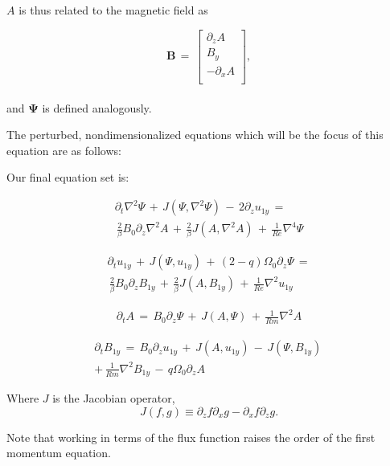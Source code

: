 \documentclass{emulateapj}
\newcommand{\beq}{\begin{equation}}
\newcommand{\eeq}{\end{equation}}
\newcommand\reye{\mathrel{Re}}
\newcommand\reym{\mathrel{Rm}}
\begin{document}
$A$ is thus related to the magnetic field as

\beq
\mathbf{B} \, = \, \left[\begin{matrix}
\partial_zA \\
B_{y} \\
-\partial_xA \\
\end{matrix}\right],\eeq \\

and $\mathbf{\Psi}$ is defined analogously.

The perturbed, nondimensionalized equations which will be the focus of this equation are as follows:

Our final equation set is: 

\begin{multline}
\label{eqset1}
\partial_t \nabla^2 \Psi \, + \, J\left(\Psi, \nabla^2 \Psi\right) \, - \, 2 \partial_z u_{1y} \, = \\
\, \frac{2}{\beta} B_0 \partial_z \nabla^2 A \, + \, \frac{2}{\beta}J\left(A, \nabla^2 A \right) \, + \, \frac{1}{\reye}\nabla^4 \Psi
\end{multline}

\begin{multline}
\label{eqset2}
\partial_t u_{1y} \, + \, J\left(\Psi, u_{1y}\right) \, + \, \left(2 - q\right) \Omega_0 \partial_z \Psi \, = \\
\, \frac{2}{\beta}B_0\partial_z B_{1y} \, + \, \frac{2}{\beta} J\left(A, B_{1y}\right) \, + \, \frac{1}{\reye} \nabla^2 u_{1y}
\end{multline}

\begin{multline}
\label{eqset3}
\partial_t A \, = \, B_0 \partial_z \Psi \, + \, J\left(A, \Psi\right) \, + \, \frac{1}{\reym} \nabla^2 A
\end{multline}

\begin{multline}
\label{eqset4}
\partial_t B_{1y} \, = \, B_0 \partial_z u_{1y} \, + \, J\left(A, u_{1y}\right) \, - \, J\left(\Psi, B_{1y}\right) \, \\
+ \, \frac{1}{\reym} \nabla^2 B_{1y}  \, - \, q \Omega_0 \partial_z A
\end{multline}

Where $J$ is the Jacobian operator, 
\beq
J\left(f, g\right) \equiv \partial_z f\partial_x g - \partial_x f \partial_z g.
\eeq  

Note that working in terms of the flux function raises the order of the first momentum equation.
\end{document}

